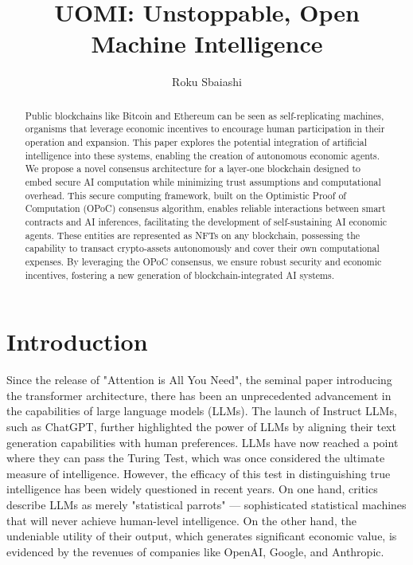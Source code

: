 \documentclass{article}
\title{UOMI: Unstoppable, Open Machine Intelligence}
\author{Roku Sbaiashi}
\begin{document}
\maketitle

\begin{abstract}


Public blockchains like Bitcoin and Ethereum can be seen as self-replicating machines, organisms that leverage economic incentives to encourage human participation in their operation and expansion. This paper explores the potential integration of artificial intelligence into these systems, enabling the creation of autonomous economic agents. We propose a novel consensus architecture for a layer-one blockchain designed to embed secure AI computation while minimizing trust assumptions and computational overhead. This secure computing framework, built on the Optimistic Proof of Computation (OPoC) consensus algorithm, enables reliable interactions between smart contracts and AI inferences, facilitating the development of self-sustaining AI economic agents. These entities are represented as NFTs on any blockchain, possessing the capability to transact crypto-assets autonomously and cover their own computational expenses. By leveraging the OPoC consensus, we ensure robust security and economic incentives, fostering a new generation of blockchain-integrated AI systems.


\end{abstract}


\section{Introduction}

Since the release of "Attention is All You Need", the seminal paper introducing the transformer architecture, there has been an unprecedented advancement in the capabilities of large language models (LLMs). The launch of Instruct LLMs, such as ChatGPT, further highlighted the power of LLMs by aligning their text generation capabilities with human preferences. LLMs have now reached a point where they can pass the Turing Test, which was once considered the ultimate measure of intelligence. However, the efficacy of this test in distinguishing true intelligence has been widely questioned in recent years. On one hand, critics describe LLMs as merely "statistical parrots" — sophisticated statistical machines that will never achieve human-level intelligence. On the other hand, the undeniable utility of their output, which generates significant economic value, is evidenced by the revenues of companies like OpenAI, Google, and Anthropic.
\end{document}
